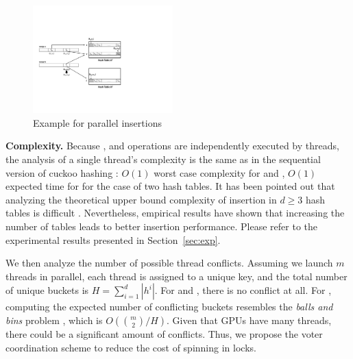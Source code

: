 \begin{figure}[t]
	\centering
	\includegraphics[width=0.48\textwidth]{fig/Voter.pdf}
	\vspace{-1em}
	\caption{Example for parallel insertions}
	\label{fig:voter}
\end{figure}
\vspace{1mm}\noindent\textbf{Complexity.}
Because ,  and  operations are independently executed by threads, 
the analysis of a single thread's complexity is the same as in the sequential version of cuckoo hashing \cite{pagh2004cuckoo}: $O(1)$ worst case complexity for  and , $O(1)$ expected time for  for the case of two hash tables. 
It has been pointed out that analyzing the theoretical upper bound complexity of insertion in $d \geq 3$ hash tables is difficult \cite{alcantara2009real}.  
Nevertheless, empirical results have shown that increasing the number of tables leads to better insertion performance. Please refer to the experimental results presented in Section~\ref{sec:exp}.

We then analyze the number of possible thread conflicts. Assuming we launch $m$ threads in parallel, each thread is assigned to a unique key, and the total number of unique buckets is $H=\sum_{i=1}^d|h^i|$. For  and , there is no conflict at all. 
For , computing the expected number of conflicting buckets resembles the \emph{balls and bins} problem \cite{raab1998balls}, which is $O(\binom{m}{2}/H)$. 
Given that GPUs have many threads, there could be a significant amount of conflicts. Thus, we propose the voter coordination scheme to reduce the cost of spinning in locks. 
